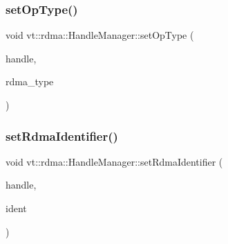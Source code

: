 \subsubsection{\texorpdfstring{set\+Op\+Type()}{setOpType()}}
{\footnotesize\ttfamily void vt\+::rdma\+::\+Handle\+Manager\+::set\+Op\+Type (\begin{DoxyParamCaption}\item[{\hyperlink{structvt_1_1rdma_1_1_handle_manager_acebfe9aa5887a015cc5da18f4f7e55ae}{R\+D\+M\+A\+\_\+\+Universal\+Id\+Type} \&}]{handle,  }\item[{\hyperlink{namespacevt_1_1rdma_ac848e1d9da43db6294bd06f83e5d3946}{R\+D\+M\+A\+\_\+\+Type\+Type} const \&}]{rdma\+\_\+type }\end{DoxyParamCaption})\hspace{0.3cm}{\ttfamily [static]}}

\mbox{\label{structvt_1_1rdma_1_1_handle_manager_a4ae25273b2cfd378111090752b9517dc}} 
\subsubsection{\texorpdfstring{set\+Rdma\+Identifier()}{setRdmaIdentifier()}}
{\footnotesize\ttfamily void vt\+::rdma\+::\+Handle\+Manager\+::set\+Rdma\+Identifier (\begin{DoxyParamCaption}\item[{\hyperlink{structvt_1_1rdma_1_1_handle_manager_acebfe9aa5887a015cc5da18f4f7e55ae}{R\+D\+M\+A\+\_\+\+Universal\+Id\+Type} \&}]{handle,  }\item[{\hyperlink{namespacevt_1_1rdma_a3b7f2eba1e9063a37d9301061c1432f1}{R\+D\+M\+A\+\_\+\+Identifier\+Type} const \&}]{ident }\end{DoxyParamCaption})\hspace{0.3cm}{\ttfamily [static]}}

\mbox{\label{structvt_1_1rdma_1_1_handle_manager_a8237e079f8a8ccf049b51778a1502e16}} 
